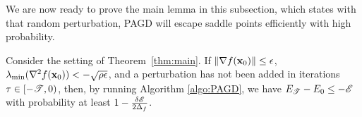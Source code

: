 We are now ready to prove the main lemma in this subsection, which states 
with that random perturbation, PAGD will escape saddle points efficiently 
with high probability.
\begingroup
\def\thetheorem{\ref{lem:negHess}}
\begin{lemma}
Consider the setting of Theorem~\ref{thm:main}. 
If $\left\|{\nabla f(\mathbf{x}_0)}\right\| \le \epsilon$, $\lambda_{\min} (\nabla^2 f(\mathbf{x}_0)) < -\sqrt{\rho\epsilon}$, 
and a perturbation has not been added in iterations $\tau \in [-\mathscr{T}, 0)$, 
then, by running Algorithm \ref{algo:PAGD}, we have $E_{\mathscr{T}} - E_0 \le -\mathscr{E}$ 
with probability at least $1-\frac{\delta \mathscr{E}}{2\Delta_f}$.
\end{lemma}
\addtocounter{theorem}{-1}
\endgroup


